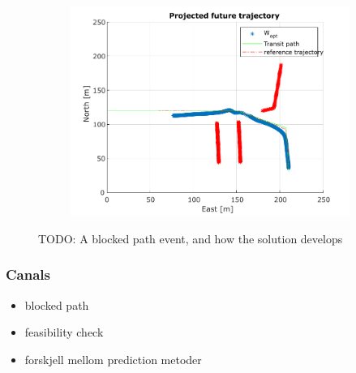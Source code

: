 \begin{figure}
\begin{subfigure}[b]{0.61\textwidth}
    \end{subfigure}
    \hfill
    \begin{subfigure}[b]{0.61\textwidth}
        \centering
        \includegraphics[width=\textwidth]{images/Completely_blocked_wopt_next.pdf}
    \end{subfigure}
    \caption{TODO: A blocked path event, and how the solution develops}
\end{figure}

\subsubsection{Canals}
\begin{itemize}
    \item blocked path
    \item feasibility check
    \item forskjell mellom prediction metoder
\end{itemize}



